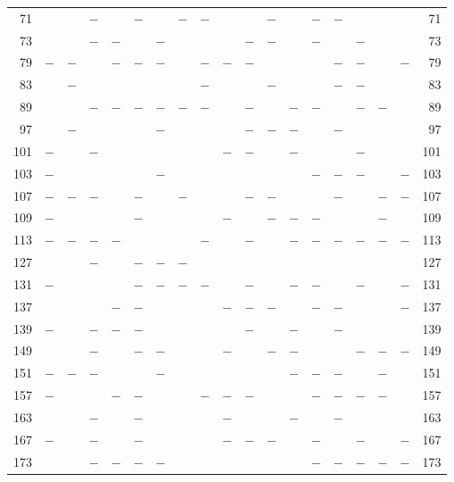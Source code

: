 \begin{center}
\begin{tabular}{r|c|c|c|c|c|c|c|c|c|c|c|c|c|c|c|c|c|r}
71 &  &  & $-$ &  & $-$ &  & $-$ & $-$ &  &  & $-$ &  & $-$ & $-$ &  &  &  & 71\\
73 &  &  & $-$ & $-$ &  & $-$ &  &  &  & $-$ & $-$ &  & $-$ &  & $-$ &  &  & 73\\
79 & $-$ & $-$ &  & $-$ & $-$ & $-$ &  & $-$ & $-$ & $-$ &  &  &  & $-$ & $-$ &  & $-$ & 79\\
83 &  & $-$ &  &  &  &  &  & $-$ &  &  & $-$ &  &  & $-$ & $-$ &  &  & 83\\
89 &  &  & $-$ & $-$ & $-$ & $-$ & $-$ & $-$ &  & $-$ &  & $-$ & $-$ &  & $-$ & $-$ &  & 89\\
97 &  & $-$ &  &  &  & $-$ &  &  &  & $-$ & $-$ & $-$ &  & $-$ &  &  &  & 97\\
101 & $-$ &  & $-$ &  &  &  &  &  & $-$ & $-$ &  & $-$ &  &  & $-$ &  &  & 101\\
103 & $-$ &  &  &  &  & $-$ &  &  &  &  &  &  & $-$ & $-$ & $-$ &  & $-$ & 103\\
107 & $-$ & $-$ & $-$ &  & $-$ &  & $-$ &  &  & $-$ & $-$ &  &  & $-$ &  & $-$ & $-$ & 107\\
109 & $-$ &  &  &  & $-$ &  &  &  & $-$ &  & $-$ & $-$ & $-$ &  &  & $-$ &  & 109\\
113 & $-$ & $-$ & $-$ & $-$ &  &  &  & $-$ &  & $-$ &  & $-$ & $-$ & $-$ & $-$ & $-$ & $-$ & 113\\
127 &  &  & $-$ &  & $-$ & $-$ & $-$ &  &  &  &  &  &  &  &  &  &  & 127\\
131 & $-$ &  &  &  & $-$ & $-$ & $-$ & $-$ &  & $-$ &  & $-$ & $-$ &  & $-$ &  & $-$ & 131\\
137 &  &  &  & $-$ & $-$ &  &  &  & $-$ & $-$ & $-$ &  & $-$ & $-$ &  &  & $-$ & 137\\
139 & $-$ &  & $-$ & $-$ & $-$ &  &  &  &  & $-$ &  & $-$ &  & $-$ &  &  &  & 139\\
149 &  &  & $-$ &  & $-$ & $-$ &  &  & $-$ &  & $-$ & $-$ &  &  & $-$ & $-$ & $-$ & 149\\
151 & $-$ & $-$ & $-$ &  &  & $-$ &  &  &  &  &  & $-$ & $-$ & $-$ &  & $-$ &  & 151\\
157 & $-$ &  &  & $-$ & $-$ &  &  & $-$ & $-$ & $-$ &  &  & $-$ & $-$ & $-$ & $-$ &  & 157\\
163 &  &  & $-$ &  & $-$ &  &  &  & $-$ &  &  & $-$ &  & $-$ &  &  &  & 163\\
167 & $-$ &  & $-$ &  & $-$ &  &  &  & $-$ & $-$ & $-$ &  & $-$ &  & $-$ &  & $-$ & 167\\
173 &  &  & $-$ & $-$ & $-$ & $-$ &  &  &  &  &  &  & $-$ & $-$ & $-$ & $-$ & $-$ & 173\\

\end{tabular}
\end{center}
